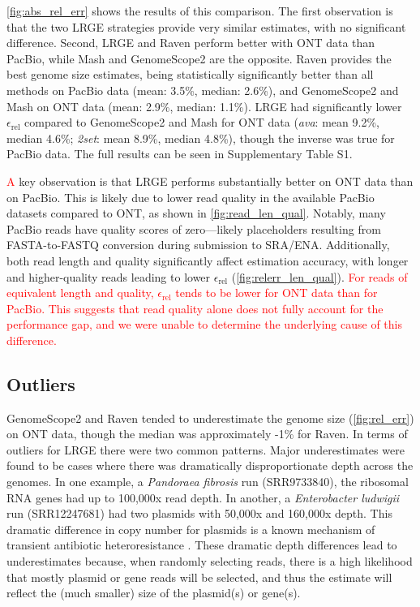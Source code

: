 \documentclass[unnumsec,webpdf,modern,large]{oup-authoring-template}
\theoremstyle{thmstyleone}%
\theoremstyle{thmstyletwo}%
\theoremstyle{thmstylethree}%
\newcommand{\lrge}{LRGE}
\newcommand{\relerr}{$\epsilon_{\text{rel}}$}
\newcommand{\ava}{\textit{ava}}
\newcommand{\twoset}{\textit{2set}}
\newcommand{\changed}[1]{\textcolor{red}{#1}}
\begin{document}
\autoref{fig:abs_rel_err} shows the results of this comparison. The first observation is that the two \lrge{} strategies provide very similar estimates, with no significant difference. Second, \lrge{} and Raven perform better with ONT data than PacBio, while Mash and GenomeScope2 are the opposite. Raven provides the best genome size estimates, being statistically significantly better than all methods on PacBio data (mean: 3.5\%, median: 2.6\%), and GenomeScope2 and Mash on ONT data (mean: 2.9\%, median: 1.1\%). \lrge{} had significantly lower \relerr{} compared to GenomeScope2 and Mash for ONT data (\ava{}: mean 9.2\%, median 4.6\%; \twoset{}: mean 8.9\%, median 4.8\%), though the inverse was true for PacBio data. The full results can be seen in Supplementary Table S1.

\changed{A} key observation is that \lrge{} performs substantially better on ONT data than on PacBio. This is likely due to lower read quality in the available PacBio datasets compared to ONT, as shown in \autoref{fig:read_len_qual}. Notably, many PacBio reads have quality scores of zero—likely placeholders resulting from FASTA-to-FASTQ conversion during submission to SRA/ENA. Additionally, both read length and quality significantly affect estimation accuracy, with longer and higher-quality reads leading to lower \relerr{} (\autoref{fig:relerr_len_qual}). \changed{For reads of equivalent length and quality, \relerr{} tends to be lower for ONT data than for PacBio. This suggests that read quality alone does not fully account for the performance gap, and we were unable to determine the underlying cause of this difference.}


\subsection{Outliers}
\label{sec:outliers}

GenomeScope2 and Raven tended to underestimate the genome size (\autoref{fig:rel_err}) on ONT data, though the median was approximately -1\% for Raven. In terms of outliers for \lrge{} there were two common patterns. Major underestimates were found to be cases where there was dramatically disproportionate depth across the genomes. In one example, a \textit{Pandoraea fibrosis} run (SRR9733840), the ribosomal RNA genes had up to 100,000x read depth. In another, a \textit{Enterobacter ludwigii} run (SRR12247681) had two plasmids with 50,000x and 160,000x depth. This dramatic difference in copy number for plasmids is a known mechanism of transient antibiotic heteroresistance \citep{nicoloff_three_2024}. These dramatic depth differences lead to underestimates because, when randomly selecting reads, there is a high likelihood that mostly plasmid or gene reads will be selected, and thus the estimate will reflect the (much smaller) size of the plasmid(s) or gene(s).
\end{document}
